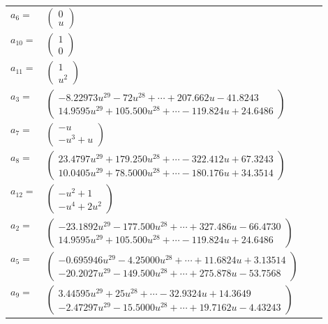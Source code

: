 \documentclass[1p]{elsarticle_modified}
\theoremstyle{definition}
\begin{document}
\begin{tabular}{m{7pt} m{180pt} m{7pt} m{180pt} }
\flushright $a_{6}=$&$\begin{pmatrix}0\\u\end{pmatrix}$ \\
\flushright $a_{10}=$&$\begin{pmatrix}1\\0\end{pmatrix}$ \\
\flushright $a_{11}=$&$\begin{pmatrix}1\\u^2\end{pmatrix}$ \\
\flushright $a_{3}=$&$\begin{pmatrix}-8.22973 u^{29}-72 u^{28}+\cdots+207.662 u-41.8243\\14.9595 u^{29}+105.500 u^{28}+\cdots-119.824 u+24.6486\end{pmatrix}$ \\
\flushright $a_{7}=$&$\begin{pmatrix}- u\\- u^3+u\end{pmatrix}$ \\
\flushright $a_{8}=$&$\begin{pmatrix}23.4797 u^{29}+179.250 u^{28}+\cdots-322.412 u+67.3243\\10.0405 u^{29}+78.5000 u^{28}+\cdots-180.176 u+34.3514\end{pmatrix}$ \\
\flushright $a_{12}=$&$\begin{pmatrix}- u^2+1\\- u^4+2 u^2\end{pmatrix}$ \\
\flushright $a_{2}=$&$\begin{pmatrix}-23.1892 u^{29}-177.500 u^{28}+\cdots+327.486 u-66.4730\\14.9595 u^{29}+105.500 u^{28}+\cdots-119.824 u+24.6486\end{pmatrix}$ \\
\flushright $a_{5}=$&$\begin{pmatrix}-0.695946 u^{29}-4.25000 u^{28}+\cdots+11.6824 u+3.13514\\-20.2027 u^{29}-149.500 u^{28}+\cdots+275.878 u-53.7568\end{pmatrix}$ \\
\flushright $a_{9}=$&$\begin{pmatrix}3.44595 u^{29}+25 u^{28}+\cdots-32.9324 u+14.3649\\-2.47297 u^{29}-15.5000 u^{28}+\cdots+19.7162 u-4.43243\end{pmatrix}$ \\

\end{tabular}
\end{document}
